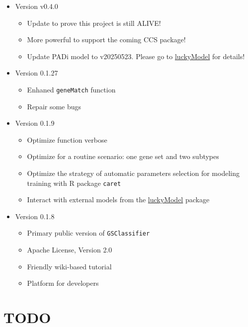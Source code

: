 \documentclass[
  12pt,
]{book}
\newcommand{\passthrough}[1]{#1}
\begin{document}
\begin{itemize}
\item
  Version v0.4.0

  \begin{itemize}
  \item
    Update to prove this project is still ALIVE!
  \item
    More powerful to support the coming CCS package!
  \item
    Update PADi model to v20250523. Please go to \href{https://github.com/huangwb8/luckyModel}{luckyModel} for details!
  \end{itemize}
\item
  Version 0.1.27

  \begin{itemize}
  \item
    Enhaned \passthrough{\lstinline!geneMatch!} function
  \item
    Repair some bugs
  \end{itemize}
\item
  Version 0.1.9

  \begin{itemize}
  \item
    Optimize function verbose
  \item
    Optimize for a routine scenario: one gene set and two subtypes
  \item
    Optimize the strategy of automatic parameters selection for modeling training with R package \passthrough{\lstinline!caret!}
  \item
    Interact with external models from the \href{https://github.com/huangwb8/luckyModel}{luckyModel} package
  \end{itemize}
\item
  Version 0.1.8

  \begin{itemize}
  \item
    Primary public version of \passthrough{\lstinline!GSClassifier!}
  \item
    Apache License, Version 2.0
  \item
    Friendly wiki-based tutorial
  \item
    Platform for developers
  \end{itemize}
\end{itemize}

\hypertarget{todo}{%
\section*{TODO}\label{todo}}
\end{document}
